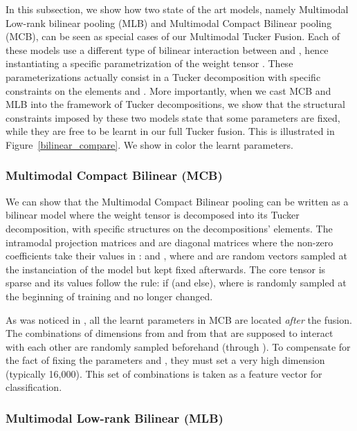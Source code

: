 \documentclass[10pt,twocolumn,letterpaper]{article}
\begin{document}
In this subsection, we show how two state of the art models, namely Multimodal Low-rank bilinear pooling \cite{Kim2017} (MLB) and Multimodal Compact Bilinear pooling \cite{fukui16mcb} (MCB), can be seen as special cases of our Multimodal Tucker Fusion. Each of these models use a different type of bilinear interaction between  and , hence instantiating a specific parametrization of the weight tensor . These parameterizations actually consist  in a Tucker decomposition with specific constraints on the elements  and . More importantly, when we cast MCB and MLB into the framework of Tucker decompositions, we show that the structural constraints imposed by these two models state that some parameters are fixed, while they are free to be learnt in our full Tucker fusion. This is illustrated in Figure~\ref{bilinear_compare}. We show in color the learnt parameters.

\subsubsection{Multimodal Compact Bilinear (MCB)}
We can show that the Multimodal Compact Bilinear pooling \cite{fukui16mcb} can be written as a bilinear model where the weight tensor  is decomposed into its Tucker decomposition, with specific structures on the decompositions' elements. The intramodal projection matrices  and  are diagonal matrices where the non-zero coefficients take their values in :
 and , where  and  are random vectors sampled at the instanciation of the model but kept fixed afterwards. The core tensor  is sparse and its values follow the rule:   if   (and   else), where  is randomly sampled at the beginning of training and no longer changed.

As was noticed in \cite{Kim2017}, all the learnt parameters in MCB are located \emph{after} the fusion. The combinations of dimensions from  and from  that are supposed to interact with each other are randomly sampled beforehand (through ). To compensate for the fact of fixing the parameters  and , they must set a very high  dimension (typically 16,000). This set of combinations is taken as a feature vector for classification. 

\subsubsection{Multimodal Low-rank Bilinear (MLB)}
\end{document}
